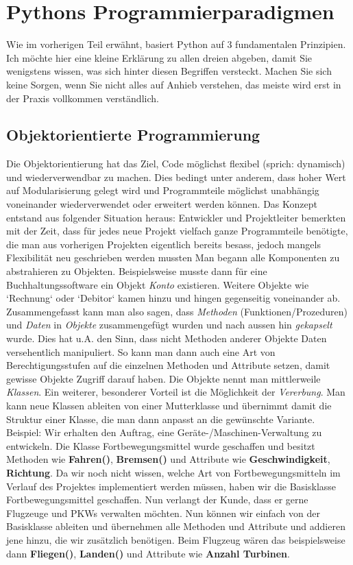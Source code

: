 \documentclass[b5paper,10pt,dvips,fleqn,titlepage,twoside]{book}
\begin{document}
\section{Pythons Programmierparadigmen}
Wie im vorherigen Teil erwähnt, basiert Python auf 3 fundamentalen Prinzipien. Ich möchte hier eine kleine Erklärung zu allen dreien abgeben, damit Sie wenigstens wissen, was sich hinter diesen Begriffen versteckt.\newline
Machen Sie sich keine Sorgen, wenn Sie nicht alles auf Anhieb verstehen, das meiste wird erst in der Praxis vollkommen verständlich.
\subsection{Objektorientierte Programmierung}
Die Objektorientierung hat das Ziel, Code möglichst flexibel (sprich: dynamisch) und wiederverwendbar zu machen. Dies bedingt unter anderem, dass hoher Wert auf Modularisierung gelegt wird und Programmteile möglichst unabhängig voneinander wiederverwendet oder erweitert werden können.\newline
Das Konzept entstand aus folgender Situation heraus: Entwickler und Projektleiter bemerkten mit der Zeit, dass für jedes neue Projekt vielfach ganze Programmteile benötigte, die man aus vorherigen Projekten eigentlich bereits besass, jedoch mangels Flexibilität neu geschrieben werden mussten\newline
Man begann alle Komponenten zu abstrahieren zu Objekten. Beispielsweise musste dann für eine Buchhaltungssoftware ein Objekt \emph{Konto} existieren. Weitere Objekte wie `Rechnung` oder `Debitor` kamen hinzu und hingen gegenseitig voneinander ab.
Zusammengefasst kann man also sagen, dass \emph{Methoden} (Funktionen/Prozeduren) und \emph{Daten} in \emph{Objekte} zusammengefügt wurden und nach aussen hin \emph{gekapselt} wurde. Dies hat u.A. den Sinn, dass nicht Methoden anderer Objekte Daten versehentlich manipuliert. So kann man dann auch eine Art von Berechtigungsstufen auf die einzelnen Methoden und Attribute setzen, damit gewisse Objekte Zugriff darauf haben. Die Objekte nennt man mittlerweile \emph{Klassen}.\newline
Ein weiterer, besonderer Vorteil ist die Möglichkeit der \emph{Vererbung}. Man kann neue Klassen ableiten von einer Mutterklasse und übernimmt damit die Struktur einer Klasse, die man dann anpasst an die gewünschte Variante.
Beispiel: Wir erhalten den Auftrag, eine Geräte-/Maschinen-Verwaltung zu entwickeln.
Die Klasse Fortbewegungsmittel wurde geschaffen und besitzt Methoden wie \textbf{Fahren()}, \textbf{Bremsen()} und Attribute wie \textbf{Geschwindigkeit}, \textbf{Richtung}.
Da wir noch nicht wissen, welche Art von Fortbewegungsmitteln im Verlauf des Projektes implementiert werden müssen, haben wir die Basisklasse Fortbewegungsmittel geschaffen. Nun verlangt der Kunde, dass er gerne Flugzeuge und PKWs verwalten möchten. Nun können wir einfach von der Basisklasse ableiten und übernehmen alle Methoden und Attribute und addieren jene hinzu, die wir zusätzlich benötigen.
Beim Flugzeug wären das beispielsweise dann \textbf{Fliegen()}, \textbf{Landen()} und Attribute wie \textbf{Anzahl Turbinen}.
\end{document}
